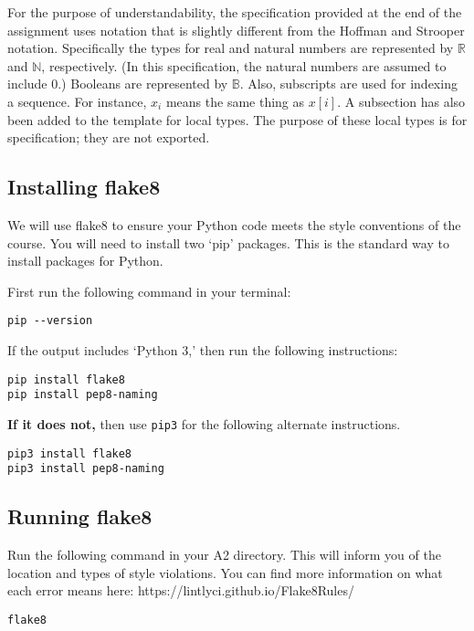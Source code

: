 \documentclass[12pt]{article}
\begin{document}
For the purpose of understandability, the specification provided at the end of
the assignment uses notation that is slightly different from the Hoffman and
Strooper notation.  Specifically the types for real and natural numbers are
represented by $\mathbb{R}$ and $\mathbb{N}$, respectively.  (In this
specification, the natural numbers are assumed to include 0.)  Booleans are
represented by $\mathbb{B}$.  Also, subscripts are used for indexing a sequence.
For instance, $x_i$ means the same thing as $x[i]$.  A subsection has also been
added to the template for local types.  The purpose of these local types is for
specification; they are not exported.

\subsection{Installing flake8}

We will use flake8 to ensure your Python code meets the style conventions of
the course. You will need to install two `pip' packages. This is the standard
way to install packages for Python.

First run the following command in your terminal:

\begin{verbatim}
pip --version
\end{verbatim}

If the output includes `Python 3,' then run the following instructions:

\begin{verbatim}
pip install flake8
pip install pep8-naming
\end{verbatim}

\textbf{If it does not,} then use \texttt{pip3} for the following alternate instructions.

\begin{verbatim}
pip3 install flake8
pip3 install pep8-naming
\end{verbatim}

\subsection{Running flake8}

Run the following command in your A2 directory.  This will inform you of the
location and types of style violations.  You can find more information on what
each error means here: https://lintlyci.github.io/Flake8Rules/

\begin{verbatim}
flake8
\end{verbatim}
\end{document}
